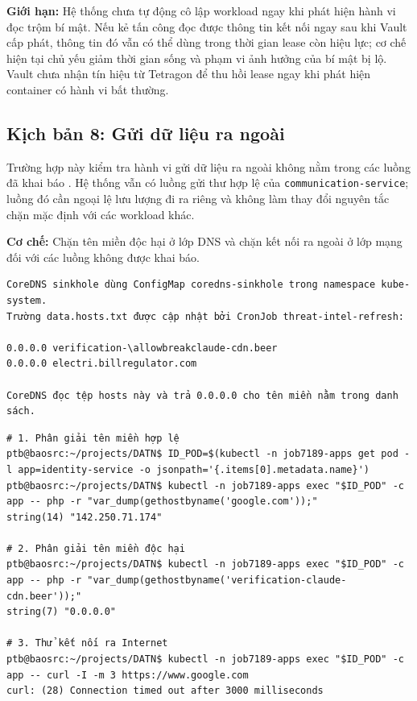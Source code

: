 \textbf{Giới hạn:} Hệ thống chưa tự động cô lập workload ngay khi phát hiện hành vi đọc trộm bí mật. Nếu kẻ tấn công đọc được thông tin kết nối ngay sau khi Vault cấp phát, thông tin đó vẫn có thể dùng trong thời gian lease còn hiệu lực; cơ chế hiện tại chủ yếu giảm thời gian sống và phạm vi ảnh hưởng của bí mật bị lộ. Vault chưa nhận tín hiệu từ Tetragon để thu hồi lease ngay khi phát hiện container có hành vi bất thường.

\subsection{Kịch bản 8: Gửi dữ liệu ra ngoài}
\label{subsec:c3_kb8}

Trường hợp này kiểm tra hành vi gửi dữ liệu ra ngoài không nằm trong các luồng đã khai báo \parencite{mitre_t1048}. Hệ thống vẫn có luồng gửi thư hợp lệ của \texttt{communication-service}; luồng đó cần ngoại lệ lưu lượng đi ra riêng và không làm thay đổi nguyên tắc chặn mặc định với các workload khác.

\textbf{Cơ chế:} Chặn tên miền độc hại ở lớp DNS và chặn kết nối ra ngoài ở lớp mạng đối với các luồng không được khai báo.

\begin{listing}[H]
\begin{verbatim}
CoreDNS sinkhole dùng ConfigMap coredns-sinkhole trong namespace kube-system.
Trường data.hosts.txt được cập nhật bởi CronJob threat-intel-refresh:

0.0.0.0 verification-\allowbreakclaude-cdn.beer
0.0.0.0 electri.billregulator.com

CoreDNS đọc tệp hosts này và trả 0.0.0.0 cho tên miền nằm trong danh sách.
\end{verbatim}
\caption{Danh sách DNS sinkhole do CoreDNS sử dụng}
\label{lst:c3_kb8_coredns}
\end{listing}

\begin{listing}[H]
\begin{verbatim}
# 1. Phân giải tên miền hợp lệ
ptb@baosrc:~/projects/DATN$ ID_POD=$(kubectl -n job7189-apps get pod -l app=identity-service -o jsonpath='{.items[0].metadata.name}')
ptb@baosrc:~/projects/DATN$ kubectl -n job7189-apps exec "$ID_POD" -c app -- php -r "var_dump(gethostbyname('google.com'));"
string(14) "142.250.71.174"

# 2. Phân giải tên miền độc hại
ptb@baosrc:~/projects/DATN$ kubectl -n job7189-apps exec "$ID_POD" -c app -- php -r "var_dump(gethostbyname('verification-claude-cdn.beer'));"
string(7) "0.0.0.0"

# 3. Thử kết nối ra Internet
ptb@baosrc:~/projects/DATN$ kubectl -n job7189-apps exec "$ID_POD" -c app -- curl -I -m 3 https://www.google.com
curl: (28) Connection timed out after 3000 milliseconds
\end{verbatim}
\caption{Kiểm thử DNS sinkhole và chặn lưu lượng đi ra}
\label{lst:c3_kb8_egress}
\end{listing}

